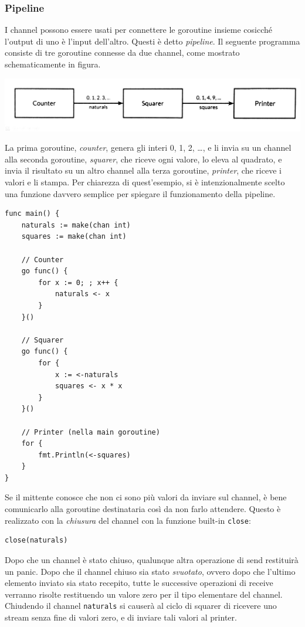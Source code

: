 \documentclass[../../../thesis.tex]{subfiles}
\begin{document}
    \subsubsection{Pipeline}
    I channel possono essere usati per connettere le goroutine insieme cosicché l'output di uno è l'input dell'altro.
    Questi è detto \textit{pipeline}.
    Il seguente programma consiste di tre goroutine connesse da due channel, come mostrato schematicamente in figura.
    \begin{center}
        \includegraphics[scale = 0.25]{figure-8.1}
    \end{center}
    La prima goroutine, \textit{counter}, genera gli interi 0, 1, 2, \ldots, e li invia su un channel alla seconda goroutine, \textit{squarer}, che riceve ogni valore, lo eleva al quadrato, e invia il risultato su un altro channel alla terza goroutine, \textit{printer}, che riceve i valori e li stampa.
    Per chiarezza di quest'esempio, si è intenzionalmente scelto una funzione davvero semplice per spiegare il funzionamento della pipeline.
    \begin{lstlisting}[frame = single, label = {lst:lstlisting7-4-2.1}]
func main() {
    naturals := make(chan int)
    squares := make(chan int)

    // Counter
    go func() {
        for x := 0; ; x++ {
            naturals <- x
        }
    }()

    // Squarer
    go func() {
        for {
            x := <-naturals
            squares <- x * x
        }
    }()

    // Printer (nella main goroutine)
    for {
        fmt.Println(<-squares)
    }
}
    \end{lstlisting}
    Se il mittente conosce che non ci sono più valori da inviare sul channel, è bene comunicarlo alla goroutine destinataria così da non farlo attendere.
    \clearpage
    \newpage
    Questo è realizzato con la \textit{chiusura} del channel con la funzione built-in \verb"close":
    \begin{lstlisting}[frame = single, label = {lst:lstlisting7-4-2.2}]
close(naturals)
    \end{lstlisting}
    Dopo che un channel è stato chiuso, qualunque altra operazione di send restituirà un panic.
    Dopo che il channel chiuso sia stato \textit{svuotato}, ovvero dopo che l'ultimo elemento inviato sia stato recepito, tutte le successive operazioni di receive verranno risolte restituendo un valore zero per il tipo elementare del channel.
    Chiudendo il channel \verb"naturals" si causerà al ciclo di squarer di ricevere uno stream senza fine di valori zero, e di inviare tali valori al printer.
    \hfill \vspace{12pt}
\end{document}
